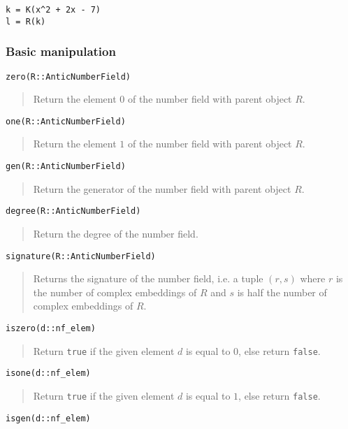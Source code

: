 \documentclass[a4paper,10pt]{article}
\newcommand{\code}{\lstinline}
\newcommand{\desc}[1]{\vspace{-3mm}\begin{quote}#1\end{quote}}
\begin{document}
{{\begin{lstlisting}
k = K(x^2 + 2x - 7)
l = R(k)
\end{lstlisting}

\subsubsection{Basic manipulation}

\begin{lstlisting}
zero(R::AnticNumberField)
\end{lstlisting}

\desc{Return the element $0$ of the number field with parent object $R$.}

\begin{lstlisting}
one(R::AnticNumberField)
\end{lstlisting}

\desc{Return the element $1$ of the number field with parent object $R$.}

\begin{lstlisting}
gen(R::AnticNumberField)
\end{lstlisting}

\desc{Return the generator of the number field with parent object $R$.}

\begin{lstlisting}
degree(R::AnticNumberField)
\end{lstlisting}

\desc{Return the degree of the number field.}

\begin{lstlisting}
signature(R::AnticNumberField)
\end{lstlisting}

\desc{Returns the signature of the number field, i.e. a tuple $(r, s)$ where $r$ is
the number of complex embeddings of $R$ and $s$ is half the number of complex embeddings of $R$.}

\begin{lstlisting}
iszero(d::nf_elem)
\end{lstlisting}

\desc{Return \code{true} if the given element $d$ is equal to $0$, else return
\code{false}.}

\begin{lstlisting}
isone(d::nf_elem)
\end{lstlisting}

\desc{Return \code{true} if the given element $d$ is equal to $1$, else return
\code{false}.}

\begin{lstlisting}
isgen(d::nf_elem)
\end{lstlisting}

}}
\end{document}

